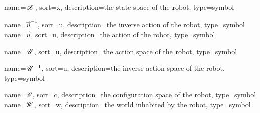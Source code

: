 	{%
		name=\ensuremath{\vecspace{X}},
		sort=x,
		description=the state space of the robot,
		type=symbol
	}
	\newcommand{\statespace}{\gls{sym:statespace}}

	\newcommand{\phasespace}{\statespace}

	{%
		name=\ensuremath{\vec{u}^{-1}},
		sort=u,
		description=the inverse action  of the robot,
		type=symbol
	}
	\newcommand{\invaction}{\gls{sym:invaction}}
	{%
		name=\ensuremath{\vec{u}},
		sort=u,
		description=the action  of the robot,
		type=symbol
	}
	\newcommand{\action}{\gls{sym:action}}

	{%
		name=\ensuremath{\vecspace{U}},
		sort=u,
		description=the action space of the robot,
		type=symbol
	}
	\newcommand{\actionspace}{\gls{sym:actionspace}}

	{%
		name=\ensuremath{\vecspace{U}^{-1}},
		sort=u,
		description=the inverse action space of the robot,
		type=symbol
	}
	\newcommand{\invactionspace}{\gls{sym:invactionspace}}

	{%
		name=\ensuremath{\vecspace{C}},
		sort=c,
		description=the configuration space of the robot,
		type=symbol
	}
	\newcommand{\configurationspace}{\gls{sym:configurationspace}}
	{%
		name=\ensuremath{\vecspace{W}},
		sort=w,
		description=the world inhabited by the robot,
		type=symbol
	}
	\newcommand{\world}{\gls{sym:worldspace}}

